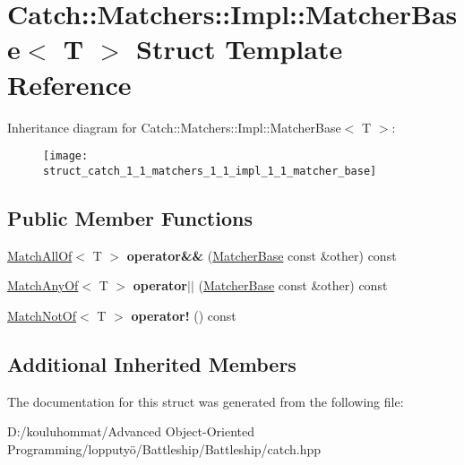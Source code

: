\hypertarget{struct_catch_1_1_matchers_1_1_impl_1_1_matcher_base}{}\section{Catch\+:\+:Matchers\+:\+:Impl\+:\+:Matcher\+Base$<$ T $>$ Struct Template Reference}
\label{struct_catch_1_1_matchers_1_1_impl_1_1_matcher_base}
Inheritance diagram for Catch\+:\+:Matchers\+:\+:Impl\+:\+:Matcher\+Base$<$ T $>$\+:\begin{figure}[H]
\begin{center}
\leavevmode
\texttt{[image: struct\_catch\_1\_1\_matchers\_1\_1\_impl\_1\_1\_matcher\_base]}
\end{center}
\end{figure}
\subsection*{Public Member Functions}
\begin{DoxyCompactItemize}
\item 
\mbox{\label{struct_catch_1_1_matchers_1_1_impl_1_1_matcher_base_a23c336f6d9457735ddc8dc7ea864d7c9}} 
\mbox{\hyperlink{struct_catch_1_1_matchers_1_1_impl_1_1_match_all_of}{Match\+All\+Of}}$<$ T $>$ {\bfseries operator\&\&} (\mbox{\hyperlink{struct_catch_1_1_matchers_1_1_impl_1_1_matcher_base}{Matcher\+Base}} const \&other) const
\item 
\mbox{\label{struct_catch_1_1_matchers_1_1_impl_1_1_matcher_base_a5f8542b8f1567a6f9c65d0a6da7b679b}} 
\mbox{\hyperlink{struct_catch_1_1_matchers_1_1_impl_1_1_match_any_of}{Match\+Any\+Of}}$<$ T $>$ {\bfseries operator$\vert$$\vert$} (\mbox{\hyperlink{struct_catch_1_1_matchers_1_1_impl_1_1_matcher_base}{Matcher\+Base}} const \&other) const
\item 
\mbox{\label{struct_catch_1_1_matchers_1_1_impl_1_1_matcher_base_a5bb94bf2ff5c7ef73b7c11eb173bdf3b}} 
\mbox{\hyperlink{struct_catch_1_1_matchers_1_1_impl_1_1_match_not_of}{Match\+Not\+Of}}$<$ T $>$ {\bfseries operator!} () const
\end{DoxyCompactItemize}
\subsection*{Additional Inherited Members}


The documentation for this struct was generated from the following file\+:\begin{DoxyCompactItemize}
\item 
D\+:/kouluhommat/\+Advanced Object-\/\+Oriented Programming/lopputyö/\+Battleship/\+Battleship/catch.\+hpp\end{DoxyCompactItemize}
